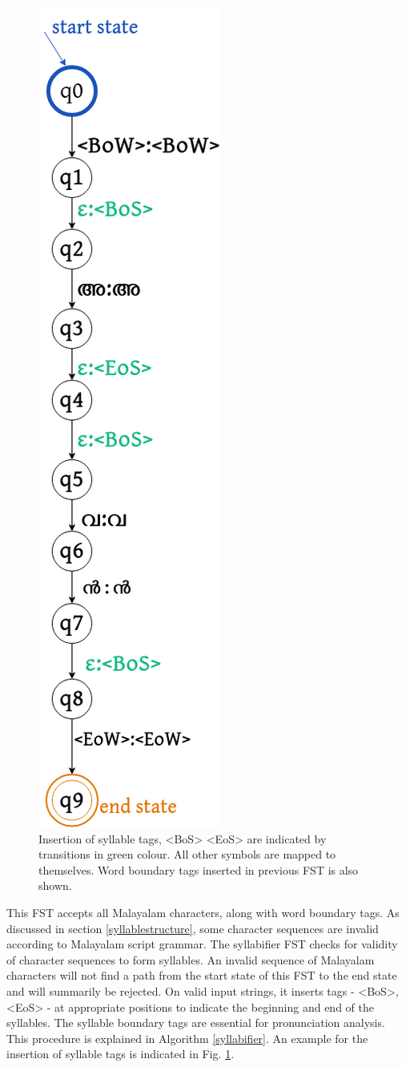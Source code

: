\documentclass{ieeeaccess}
\begin{document}
\begin{figure}[h]
	\centering
	\includegraphics[width=0.25\linewidth]{egs_syltags.png}
	\caption{Insertion of syllable tags, {\ipa <BoS> <EoS>} are indicated by transitions in green colour. All other symbols are mapped to themselves. Word boundary tags inserted in previous FST is also shown. }
	\label{egs_syltags}
\end{figure}
This FST accepts all Malayalam characters, along with word boundary tags. As discussed in section  \ref{syllablestructure}, some character sequences are invalid according to Malayalam script grammar. The syllabifier FST checks for validity of character sequences to form syllables.  An invalid sequence of Malayalam characters will  not find a path from the start state of this FST to the end state and will summarily be rejected. On valid input strings, it inserts tags - {\ipa <BoS>}, {\ipa <EoS>} - at appropriate positions to indicate the beginning and end of the syllables. The syllable boundary tags are essential for pronunciation analysis. This procedure is explained in Algorithm \ref{syllabifier}. An example for the insertion of syllable tags is indicated in Fig. \ref{egs_syltags}.
\end{document}
